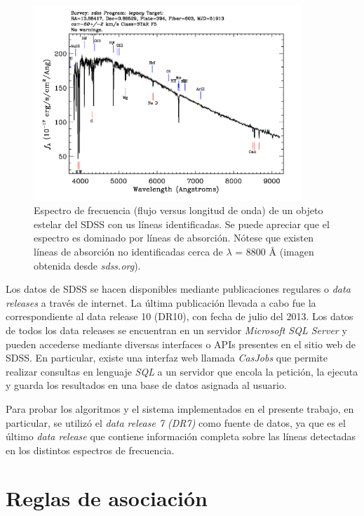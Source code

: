 \begin{figure}[h!]
\begin{center}
\includegraphics[width=0.9\textwidth]{imagenes/sdss_spec.png}
\end{center}
\vspace*{-5mm}
\caption{Espectro de frecuencia (flujo versus longitud de onda) de un objeto estelar del SDSS con us líneas identificadas. Se puede apreciar que el espectro es dominado por líneas de absorción. Nótese que existen líneas de absorción no identificadas cerca de $\lambda$ = 8800 {\AA} (imagen obtenida desde \textit{sdss.org}).}
\label{fig:sdss_spec}
\end{figure}

Los datos de SDSS se hacen disponibles mediante publicaciones regulares o \textit{data releases} a través de internet. La última publicación llevada a cabo fue la correspondiente al data release 10 (DR10), con fecha de julio del 2013. Los datos de todos los data releases se encuentran en un servidor \textit{Microsoft SQL Server} y pueden accederse mediante diversas interfaces o APIs presentes en el sitio web de SDSS. En particular, existe una interfaz web llamada \textit{CasJobs} que permite realizar consultas en lenguaje \textit{SQL} a un servidor que encola la petición, la ejecuta y guarda los resultados en una base de datos asignada al usuario.

Para probar los algoritmos y el sistema implementados en el presente trabajo, en particular, se utilizó el \textit{data release 7 (DR7)} como fuente de datos, ya que es el último \textit{data release} que contiene información completa sobre las líneas detectadas en los distintos espectros de frecuencia.

\section{Reglas de asociación}

